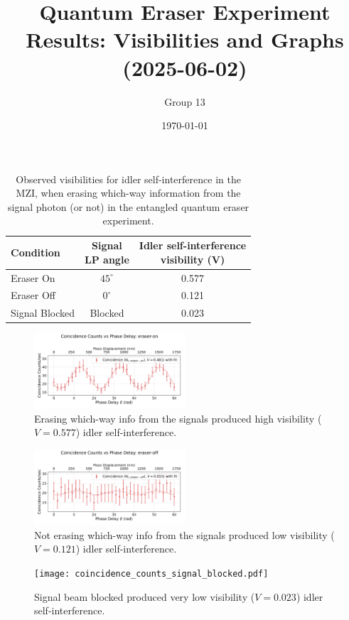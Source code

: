\documentclass{article}
\title{Quantum Eraser Experiment Results: Visibilities and Graphs (2025-06-02)}
\author{Group 13} %
\date{\today}
\begin{document}
\pagestyle{empty} %

%

\begin{table}[h!]
\centering
\begin{tabular}{lcc}
\toprule
Condition & \makecell{Signal \\ LP angle} & \makecell{Idler self-interference \\ visibility (V)} \\
\midrule
Eraser On          & $45^\circ$  & 0.577 \\
Eraser Off         & $0^\circ$ & 0.121 \\
Signal Blocked     & Blocked & 0.023 \\
\bottomrule
\end{tabular}
\caption{
  Observed visibilities for idler self-interference in the MZI,
  when erasing which-way information from the signal photon (or not)
  in the entangled quantum eraser experiment.}
\end{table}

\begin{figure}[h!]
\centering
\includegraphics[width=0.5\textwidth]{coincidence_counts_eraser_on.pdf}
\caption{
  Erasing which-way info from the signals
  produced high visibility ($V=0.577$) idler self-interference.
}
\end{figure}

\begin{figure}[h!]
\centering
\includegraphics[width=0.5\textwidth]{coincidence_counts_eraser_off.pdf}
\caption{
  Not erasing which-way info from the signals
  produced low visibility ($V=0.121$) idler self-interference.
}
\end{figure}

\begin{figure}[h!]
\centering
\texttt{[image: coincidence\_counts\_signal\_blocked.pdf]}
\caption{
  Signal beam blocked
  produced very low visibility ($V=0.023$) idler self-interference.
}
\end{figure}
\end{document}
